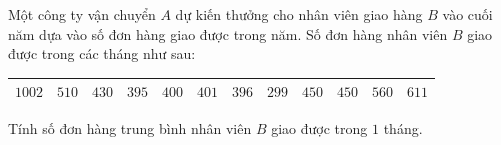 \begin{ex}
Một công ty vận chuyển $A$ dự kiến thưởng cho nhân viên giao hàng $B$ vào cuối năm dựa vào số đơn hàng giao được trong năm. Số đơn hàng nhân viên $B$ giao được trong các tháng như sau:
\begin{center}
\begin{tabular}{|c|c|c|c|c|c|c|c|c|c|c|c|}\hline
$1002$ & $510$ & $430$ & $395$ & $400$ & $401$ & $396$ & $299$ & $450$ & $450$ & $560$ & $611$\\\hline
\end{tabular}
\end{center}
Tính số đơn hàng trung bình nhân viên $B$ giao được trong $1$ tháng.
\end{ex}
